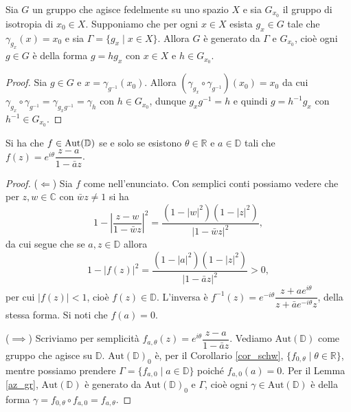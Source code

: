 \begin{lm} \label{az_gr}
  Sia $G$ un gruppo che agisce fedelmente su uno spazio $X$ e sia $G_{x_0}$ il gruppo di isotropia di $x_0 \in X$. Supponiamo che per ogni $x \in X$ esista $g_x \in G$ tale che $\gamma_{g_x}(x)=x_0$ e sia $\Gamma=\{g_x \mid x \in X\}$.
  Allora $G$ è generato da $\Gamma$ e $G_{x_0}$, cioè ogni $g \in G$ è della forma $g=hg_x$ con $x \in X$ e $h \in G_{x_0}$.
\end{lm}

\begin{proof}
  Sia $g \in G$ e $x=\gamma_{g^{-1}}(x_0)$. Allora $(\gamma_{g_x}\circ \gamma_{g^{-1}})(x_0)=x_0$ da cui $\gamma_{g_x}\circ \gamma_{g^{-1}}=\gamma_{g_xg^{-1}}=\gamma_h$ con $h \in G_{x_0}$,
  dunque $g_xg^{-1}=h$ e quindi $g=h^{-1}g_x$ con $h^{-1} \in G_{x_0}$.
\end{proof}

\begin{prop} \label{aut}
  Si ha che $f \in \text{\normalfont{Aut}}(\mathbb{D})$ se e solo se esistono $\theta \in \mathbb{R}$ e $a \in \mathbb{D}$ tali che $f(z)=e^{i\theta}\dfrac{z-a}{1-\bar{a}z}$.
\end{prop}

\begin{proof}
  ($\Leftarrow$) Sia $f$ come nell'enunciato. Con semplici conti possiamo vedere che per $z,w \in \mathbb{C}$ con $\bar{w}z\not=1$ si ha
  \begin{equation} \label{formuletta}
    1-\left|\frac{z-w}{1-\bar{w}z}\right|^2=\frac{(1-|w|^2)(1-|z|^2)}{|1-\bar{w}z|^2},
  \end{equation}
  da cui segue che se $a, z \in \mathbb{D}$ allora
  $$1-|f(z)|^2=\frac{(1-|a|^2)(1-|z|^2)}{|1-\bar{a}z|^2}>0,$$
  per cui $|f(z)|<1$, cioè $f(z) \in \mathbb{D}$. L'inversa è $f^{-1}(z)=e^{-i\theta}\dfrac{z+ae^{i\theta}}{z+\bar{a}e^{-i\theta}z}$, della stessa forma. Si noti che $f(a)=0$.

  ($\implies$) Scriviamo per semplicità $f_{a, \theta}(z)=e^{i\theta}\dfrac{z-a}{1-\bar{a}z}$. Vediamo $\text{Aut}(\mathbb{D})$ come gruppo che agisce su $\mathbb{D}$. $\text{Aut}(\mathbb{D})_0$ è, per il Corollario \ref{cor_schw}, $\{f_{0, \theta} \mid \theta \in \mathbb{R}\}$,
  mentre possiamo prendere $\Gamma=\{f_{a, 0} \mid a \in \mathbb{D}\}$ poiché $f_{a, 0}(a)=0$.
  Per il Lemma \ref{az_gr}, $\text{Aut}(\mathbb{D})$ è generato da $\text{Aut}(\mathbb{D})_0$ e $\Gamma$, cioè ogni $\gamma \in \text{Aut}(\mathbb{D})$ è della forma $\gamma=f_{0, \theta} \circ f_{a, 0}=f_{a, \theta}$.
\end{proof}

